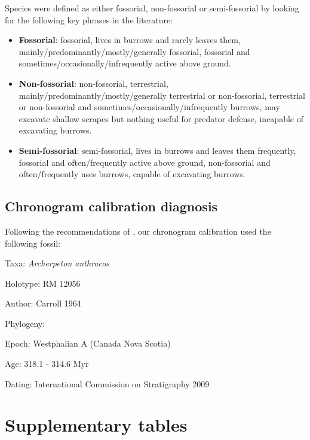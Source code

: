 Species were defined as either fossorial, non-fossorial or semi-fossorial by looking for the following key phrases in the literature:
\begin{itemize}
\item \textbf{Fossorial}: fossorial, lives in burrows and rarely leaves them, mainly/predominantly/mostly/generally fossorial, fossorial and sometimes/occasionally/infrequently active above ground. 
\item \textbf{Non-fossorial}: non-fossorial, terrestrial, mainly/predominantly/mostly/generally terrestrial or non-fossorial, terrestrial or non-fossorial and sometimes/occasionally/infrequently burrows, may excavate shallow scrapes but nothing useful for predator defense, incapable of excavating burrows.
\item \textbf{Semi-fossorial}: semi-fossorial, lives in burrows and leaves them frequently, fossorial and often/frequently active above ground, non-fossorial and often/frequently uses burrows, capable of excavating burrows.
\end{itemize}


\subsection{Chronogram calibration diagnosis}

Following the recommendations of \cite{parham2011best}, our chronogram calibration used the following fossil:


Taxa: \textit{Archerpeton anthracos}

Holotype: RM 12056

Author: Carroll 1964

Phylogeny: \citep{reisz2004molecular}

Epoch: Westphalian A (Canada Nova Scotia)

Age: 318.1 - 314.6 Myr

Dating: International Commission on Stratigraphy 2009




\section{Supplementary tables}

